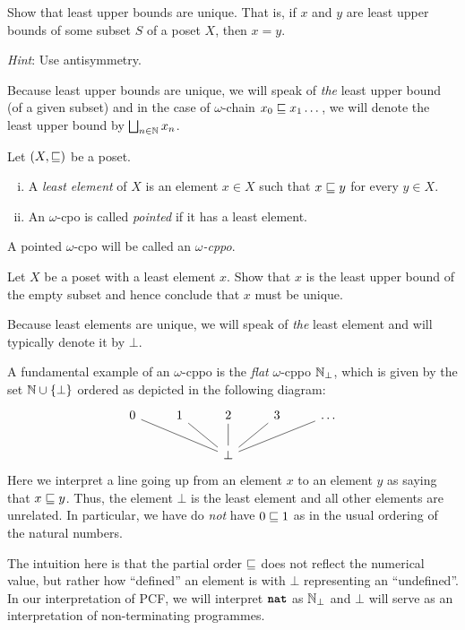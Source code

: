 \begin{exercise}\label{exer:least-upper-bounds-are-unique}
  Show that least upper bounds are unique. That is, if \(x\) and \(y\) are least
  upper bounds of some subset \(S\) of a poset \(X\), then \(x = y\).

  \emph{Hint}: Use antisymmetry.
\end{exercise}

Because least upper bounds are unique, we will speak of \emph{the} least upper
bound (of a given subset) and in the case of \(\omega\)-chain
\(x_0 \sqsubseteq x_1 \dots\), we will denote the least upper bound by
\(\bigsqcup_{n \in \mathbb N}x_n\).

\begin{definition}
  Let \((X,{\sqsubseteq})\) be a poset.
  \begin{enumerate}[(i)]
  \item A \emph{least element} of \(X\) is an element \(x \in X\) such that
    \(x \sqsubseteq y\) for every \(y \in X\).
  \item An \(\omega\)-cpo is called \emph{pointed} if it has a least element.
  \end{enumerate}
  A pointed \(\omega\)-cpo will be called an \emph{\(\omega\)-cppo}.
\end{definition}

\begin{exercise}\label{exer:least-element-is-unique}
  Let \(X\) be a poset with a least element \(x\). Show that \(x\) is the least
  upper bound of the empty subset and hence conclude that \(x\) must be unique.
\end{exercise}

Because least elements are unique, we will speak of \emph{the} least element and
will typically denote it by \(\bot\).

\begin{example}[\(\Nat_\bot\)]\label{exam:N_bot}
  A fundamental example of an \(\omega\)-cppo is the \emph{flat} \(\omega\)-cppo
  \(\Nat_\bot\), which is given by the set \(\mathbb N \cup \{\bot\}\) ordered as
  depicted in the following diagram:
  \[
    \begin{tikzcd}
      0 & 1 & 2 & 3 & \ldots \\
      & & \bot \ar[ull,no head] \ar[ul,no head] \ar[u,no head] \ar[ur, no head]
      \ar[urr, no head]
    \end{tikzcd}
  \]
  Here we interpret a line going up from an element \(x\) to an element \(y\) as
  saying that \(x \sqsubseteq y\).
  Thus, the element \(\bot\) is the least element and all other elements are
  unrelated.
  In particular, we have do \emph{not} have \(0 \sqsubseteq 1\) as in the usual
  ordering of the natural numbers.

  The intuition here is that the partial order \({\sqsubseteq}\) does not reflect the
  numerical value, but rather how ``defined'' an element is with \(\bot\)
  representing an ``undefined''.
  In our interpretation of PCF, we will interpret \(\texttt{\textbf{nat}}\) as \(\Nat_\bot\)
  and \(\bot\) will serve as an interpretation of non-terminating programmes.
\end{example}


